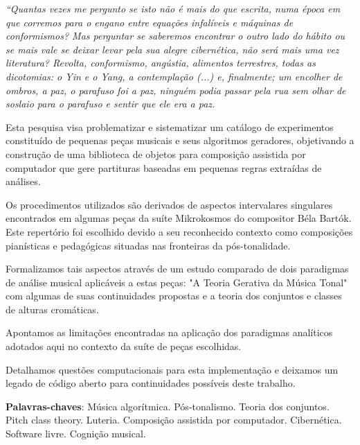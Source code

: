 \documentclass[
	12pt,				%
	openright,			%
	twoside,			%
	a4paper,			%
	english,			%
	french,				%
	spanish,			%
	brazil				%
	]{abntex2}
\begin{document}





\begin{epigrafe}
    \vspace*{\fill}
	\begin{flushright}
		\textit{``Quantas vezes me pergunto se isto não é mais do que escrita, numa época em que corremos para o engano entre equações infalíveis e máquinas de conformismos? Mas perguntar se saberemos encontrar o outro lado do hábito ou se mais vale se deixar levar pela sua alegre cibernética, não será mais uma vez literatura? Revolta, conformismo, angústia, alimentos terrestres, todas as dicotomias: o Yin e o Yang, a contemplação (...) e, finalmente; um encolher de ombros, a paz, o parafuso foi a paz, ninguém podia passar pela rua sem olhar de soslaio para o parafuso e sentir que ele era a paz. \cite{cortazar1963} }
	\end{flushright}
\end{epigrafe}


\setlength{\absparsep}{18pt} %
\begin{resumo}


Esta pesquisa visa problematizar e sistematizar um catálogo de experimentos constituído de pequenas peças musicais e seus algoritmos geradores, objetivando a construção de uma biblioteca de objetos para composição assistida por computador que gere partituras baseadas em pequenas regras extraídas de análises.

Os procedimentos utilizados são derivados de aspectos intervalares singulares encontrados em algumas peças da suíte Mikrokosmos do compositor Béla Bartók. Este repertório foi escolhido devido a seu reconhecido contexto como composições pianísticas e pedagógicas situadas nas fronteiras da pós-tonalidade. 

Formalizamos tais aspectos através de um estudo comparado de dois paradigmas de análise musical aplicáveis a estas peças: "A Teoria Gerativa da Música Tonal"\cite{lerdahl1983generative} com algumas de suas continuidades propostas \cite{lerdahl2009genesis,temperley2004cognition} e a teoria dos conjuntos e classes de alturas cromáticas.\cite{forte1973structure,straus2004}

Apontamos as limitações encontradas na aplicação dos paradigmas analíticos adotados aqui no contexto da suíte de peças escolhidas.

Detalhamos questões computacionais para esta implementação e deixamos um legado de código aberto para continuidades possíveis deste trabalho.


 \textbf{Palavras-chaves}: Música algorítmica. Pós-tonalismo. Teoria dos conjuntos. Pitch class theory. Luteria. Composição assistida por computador. Cibernética. Software livre. Cognição musical.
\end{resumo}
\end{document}
